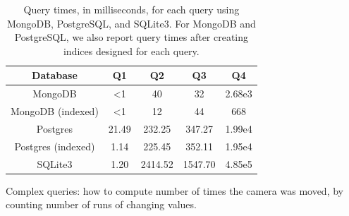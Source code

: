 \documentclass[nocopyrightspace]{acm_proc_article-sp}
\begin{document}
\begin{table}
    \centering
    \begin{tabular}{c | c | c | c | c}
        Database           & Q1     & Q2      & Q3      & Q4     \\
        \hline
        MongoDB            & <1     & 40      & 32      & 2.68e3 \\
        MongoDB (indexed)  & <1     & 12      & 44      & 668    \\
        Postgres           & 21.49  & 232.25  & 347.27  & 1.99e4 \\
        Postgres (indexed) & 1.14   & 225.45  & 352.11  & 1.95e4 \\
        SQLite3            & 1.20   & 2414.52 & 1547.70 & 4.85e5 
    \end{tabular}
    \caption{Query times, in milliseconds, for each query using MongoDB, PostgreSQL, and SQLite3. For MongoDB and PostgreSQL, we also report query times after creating indices designed for each query.}
    \label{tab:queries}
\end{table}


Complex queries: how to compute number of times the camera was moved, by counting number of runs of changing values.








  

\end{document}
